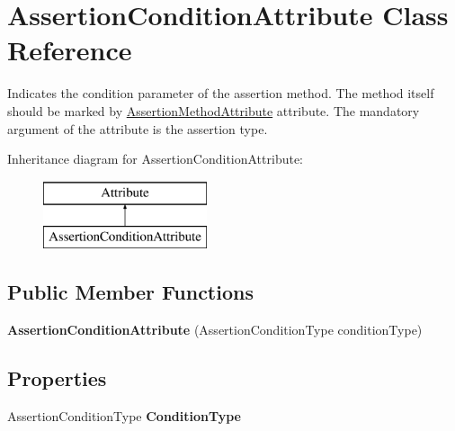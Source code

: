 \hypertarget{class_assertion_condition_attribute}{}\section{Assertion\+Condition\+Attribute Class Reference}
\label{class_assertion_condition_attribute}


Indicates the condition parameter of the assertion method. The method itself should be marked by \hyperlink{class_assertion_method_attribute}{Assertion\+Method\+Attribute} attribute. The mandatory argument of the attribute is the assertion type.  


Inheritance diagram for Assertion\+Condition\+Attribute\+:\begin{figure}[H]
\begin{center}
\leavevmode
\includegraphics[height=2.000000cm]{class_assertion_condition_attribute}
\end{center}
\end{figure}
\subsection*{Public Member Functions}
\begin{DoxyCompactItemize}
\item 
\hypertarget{class_assertion_condition_attribute_a9e8e78b2fe91bb29f18154940860af32}{}{\bfseries Assertion\+Condition\+Attribute} (Assertion\+Condition\+Type condition\+Type)\label{class_assertion_condition_attribute_a9e8e78b2fe91bb29f18154940860af32}

\end{DoxyCompactItemize}
\subsection*{Properties}
\begin{DoxyCompactItemize}
\item 
\hypertarget{class_assertion_condition_attribute_ad07b5dd15df52a5c307ed41dda8299ef}{}Assertion\+Condition\+Type {\bfseries Condition\+Type}\label{class_assertion_condition_attribute_ad07b5dd15df52a5c307ed41dda8299ef}

\end{DoxyCompactItemize}


